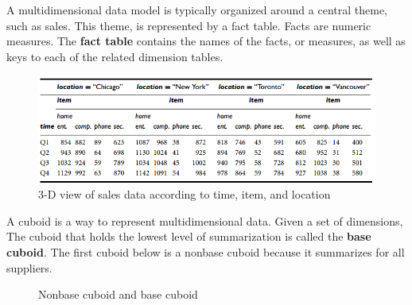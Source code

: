 		A multidimensional data model is typically organized around a central theme, such
		as sales. This theme, is represented by a fact table. Facts are numeric measures.
		The {\bf fact table} contains the names of the facts, or measures, as well as keys
		to each of the related dimension tables.

		\begin{figure}[H]
			\centering
			\includegraphics[scale=0.5]{pics/3D.png}
			\caption{3-D view of sales data according to time, item, and location}
		\end{figure}

		A cuboid is a way to represent multidimensional data. Given a set of dimensions, 
		The cuboid that holds the lowest level of summarization is called the {\bf base cuboid}.
		The first cuboid below is a nonbase cuboid because it summarizes for all suppliers. 
		\begin{figure}[H]
			\caption{Nonbase cuboid and base cuboid}
		\end{figure}

